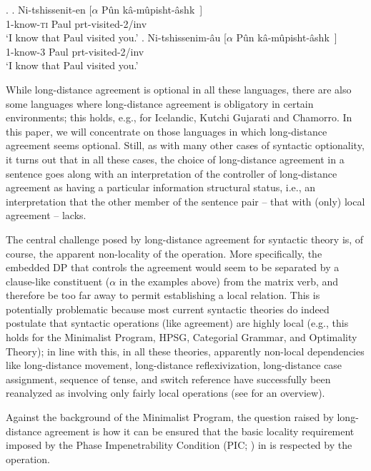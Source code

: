 \documentclass[output=paper
,modfonts
,nonflat]{langsci/langscibook}
\begin{document}
\Lsciexi. \label{5}
     \ag.  Ni-tshissenit-en [$\alpha$ P\^{u}n k\^{a}-m\^{u}pisht-\^{a}shk~] \\
     1-know-{{\scshape ti}} {} Paul {\sc prt}-visited-2/{\sc inv} \\
 `I know that Paul visited you.'
\bg.   Ni-tshissenim-{\^a}u [$\alpha$ P\^{u}n k\^{a}-m\^{u}pisht-\^{a}shk~] \\
     1-know-{3} {} {Paul} {\sc prt}-visited-2/{\sc inv} \\
      `I know that Paul visited you.'

While long-distance agreement is optional in all these languages,
there are also some languages where long-distance agreement is
obligatory in certain environments; this holds, e.g., for Icelandic,
Kutchi Gujarati and Chamorro.  In this paper, we will concentrate on
those languages in which long-distance agreement seems
optional. Still, as with many other cases of syntactic optionality, it
turns out that in all these cases, the choice of long-distance
agreement in a sentence goes along with an interpretation of the
controller of long-distance agreement as having a particular
information structural status, i.e., an interpretation that the other
member of the sentence pair -- that with (only) local agreement --
lacks. 

The central challenge posed by long-distance agreement for syntactic
theory is, of course, the apparent non-locality of the operation. More
specifically, the embedded DP that controls the agreement would seem
to be separated by a clause-like constituent ($\alpha$ in the examples
above) from the matrix verb, and therefore be too far away to permit
establishing a local relation.  This is potentially problematic
because most current syntactic theories do indeed postulate that
syntactic operations (like agreement) are highly local (e.g., this
holds for the Minimalist Program, HPSG, Categorial Grammar, and Optimality
Theory); in line with this, in all these theories, apparently
non-local dependencies like long-distance movement, long-distance
reflexivization, long-distance case assignment, sequence of tense, and
switch reference have successfully been reanalyzed as involving only
fairly local operations (see \cite*{Alexiadouetal:12} for an
overview).

Against the background of the Minimalist Program, the question raised
by long-distance agreement is how it can be ensured that the basic
locality requirement imposed by the Phase Impenetrability Condition
(PIC; \cite{Chomsky:00,Chomsky:01,Chomsky:08,Chomsky:13}) in \Next is
respected by the operation. 
\end{document}
